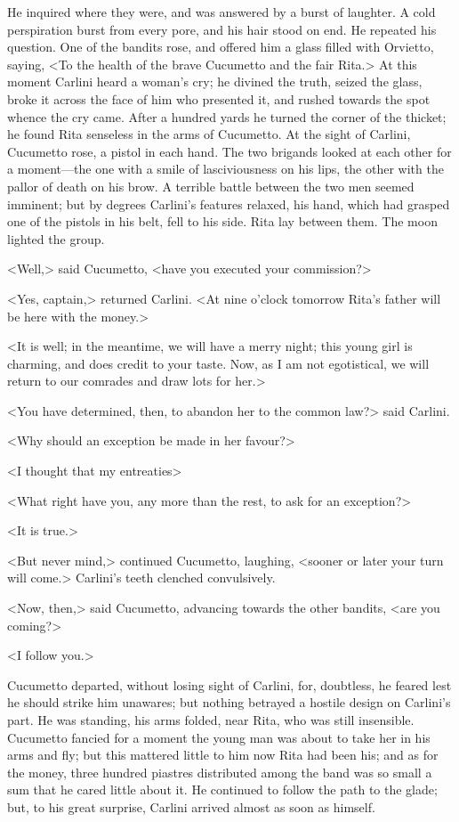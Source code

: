 {He inquired where they were, and was answered by a burst of laughter. A cold perspiration burst from every pore, and his hair stood on end. He repeated his question. One of the bandits rose, and offered him a glass filled with Orvietto, saying, <To the health of the brave Cucumetto and the fair Rita.> At this moment Carlini heard a woman's cry; he divined the truth, seized the glass, broke it across the face of him who presented it, and rushed towards the spot whence the cry came. After a hundred yards he turned the corner of the thicket; he found Rita senseless in the arms of Cucumetto. At the sight of Carlini, Cucumetto rose, a pistol in each hand. The two brigands looked at each other for a moment—the one with a smile of lasciviousness on his lips, the other with the pallor of death on his brow. A terrible battle between the two men seemed imminent; but by degrees Carlini's features relaxed, his hand, which had grasped one of the pistols in his belt, fell to his side. Rita lay between them. The moon lighted the group. 

<Well,> said Cucumetto, <have you executed your commission?> 

<Yes, captain,> returned Carlini. <At nine o'clock tomorrow Rita's father will be here with the money.> 

<It is well; in the meantime, we will have a merry night; this young girl is charming, and does credit to your taste. Now, as I am not egotistical, we will return to our comrades and draw lots for her.> 

<You have determined, then, to abandon her to the common law?> said Carlini. 

<Why should an exception be made in her favour?> 

<I thought that my entreaties\longdash> 

<What right have you, any more than the rest, to ask for an exception?> 

<It is true.> 

<But never mind,> continued Cucumetto, laughing, <sooner or later your turn will come.> Carlini's teeth clenched convulsively. 

<Now, then,> said Cucumetto, advancing towards the other bandits, <are you coming?> 

<I follow you.>  

Cucumetto departed, without losing sight of Carlini, for, doubtless, he feared lest he should strike him unawares; but nothing betrayed a hostile design on Carlini's part. He was standing, his arms folded, near Rita, who was still insensible. Cucumetto fancied for a moment the young man was about to take her in his arms and fly; but this mattered little to him now Rita had been his; and as for the money, three hundred piastres distributed among the band was so small a sum that he cared little about it. He continued to follow the path to the glade; but, to his great surprise, Carlini arrived almost as soon as himself. 

}
